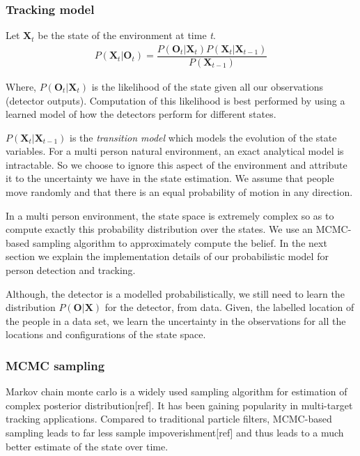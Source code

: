 \subsubsection{Tracking model}

Let $\textbf{X}_{t}$ be the state of the environment at time \textit{t}.
\begin{align}
P(\textbf{X}_{t} | \textbf{O}_{t}) = \dfrac{P(\textbf{O}_{t} | \textbf{X}_{t}) P(\textbf{X}_{t}|\textbf{X}_{t-1})} {P(\textbf{X}_{t-1})}
\end{align} 

Where, $P(\textbf{O}_{t} | \textbf{X}_{t})$ is the likelihood of the state given all our observations (detector outputs). Computation of this likelihood is best performed by using a learned model of how the detectors perform for different states.

$P(\textbf{X}_{t}|\textbf{X}_{t-1})$ is the \textit{transition model} which models the evolution of the state variables. For a multi person natural environment, an exact analytical model is intractable. So we choose to ignore this aspect of the environment and attribute it to the uncertainty we have in the state estimation. We assume that people move randomly and that there is an equal probability of motion in any direction. 

In a multi person environment, the state space is extremely complex so as to compute exactly this probability 
distribution over the states. We use an MCMC-based \cite{khan2004mcmc} sampling algorithm to approximately compute the belief. In the next section we explain the implementation details of our probabilistic model for person detection and tracking.


Although, the detector is a modelled probabilistically, we still need to learn the distribution $P(\textbf{O}|\textbf{X})$ for the detector, from data. Given, the labelled location of the people in a data set, we learn the uncertainty in the observations for all the locations and configurations of the state space.
\subsubsection{MCMC sampling}
\label{MCMC}
Markov chain monte carlo is a widely used sampling algorithm for estimation of complex posterior distribution[ref]. It has been gaining popularity in multi-target tracking applications. Compared to traditional particle filters, MCMC-based sampling leads to far less sample impoverishment[ref] and thus leads to a much better estimate of the state over time.

